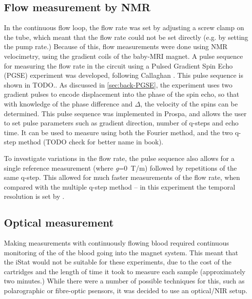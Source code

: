 \subsection{Flow measurement by NMR}
In the continuous flow loop, the flow rate was set by adjusting a screw clamp on the tube, which meant that the flow rate could not be set directly (e.g. by setting the pump rate.)
Because of this, flow measurements were done using NMR velocimetry, using the gradient coils of the baby-MRI magnet.
A pulse sequence for measuring the flow rate in the circuit using a Pulsed Gradient Spin Echo (PGSE) experiment was developed, following Callaghan \cite{CallaghanTranslationalDynamicsMagnetic2014}.
This pulse sequence is shown in TODO..
As discussed in \autoref{sec:back-PGSE}, the experiment uses two gradient pulses to encode displacement into the phase of the spin echo, so that with knowledge of the phase difference and $\Delta$, the velocity of the spins can be determined.
This pulse sequence was implemented in Prospa, and allows the user to set pulse parameters such as gradient direction, number of q-steps and echo time.
It can be used to measure using both the Fourier method, and the two q-step method (TODO check for better name in book).

To investigate variations in the flow rate, the pulse sequence also allows for a single reference measurement (where \textit{g}=\SI{0}{T/m}) followed by repetitions of the same q-step.
This allowed for much faster measurements of the flow rate, when compared with the multiple q-step method -- in this experiment the temporal resolution is set by \TR.


\subsection{Optical \SOtwo measurement}
\label{sec:exptsetup-pulseoximeter}
Making measurements with continuously flowing blood required continuous monitoring of the \SOtwo of the blood going into the magnet system.
This meant that the iStat would not be suitable for these experiments, due to the cost of the cartridges and the length of time it took to measure each sample (approximately two minutes.)
While there were a number of possible techniques for this, such as polarographic or fibre-optic p\Otwo sensors, it was decided to use an optical/NIR setup.

